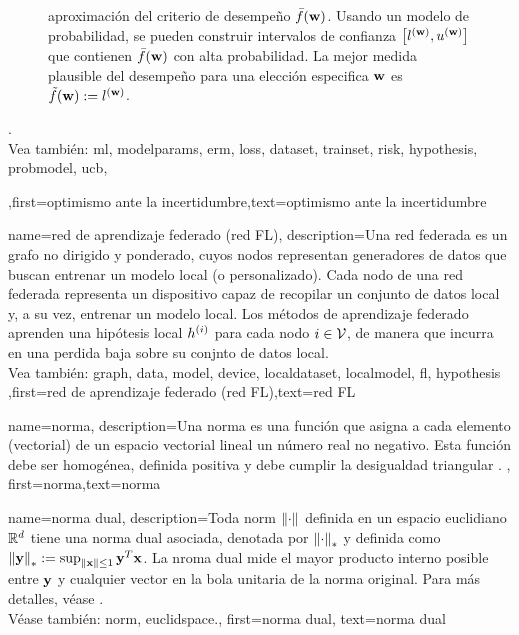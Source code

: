{{\begin{figure}[H]
\begin{center}
{	aproximación del criterio de desempeño $\bar{f}({\bf w})$. Usando un modelo de probabilidad, se pueden construir intervalos de confianza $\big[ l^{({\bf w})},  u^{({\bf w})} \big]$ 
	que contienen $\bar{f}({\bf w})$ con alta probabilidad. La mejor medida plausible del desempeño para una elección especifica ${\bf w}$ es $\tilde{f}({\bf w}) := l^{({\bf w})}$.} 
	\end{center}
		\end{figure}.
		\\
	 Vea también: \gls{ml}, \gls{modelparams}, \gls{erm}, \gls{loss}, \gls{dataset}, \gls{trainset}, \gls{risk}, \gls{hypothesis}, \gls{probmodel}, \gls{ucb},  },first={optimismo ante la incertidumbre},text={optimismo ante la incertidumbre} 
}

{name={red de aprendizaje federado (red FL)},
	description={Una red federada es un grafo no dirigido y ponderado, 
	cuyos nodos representan generadores de datos que buscan entrenar un modelo local (o personalizado). 
	Cada nodo de una red federada representa un dispositivo capaz de recopilar un conjunto de datos local
	y, a su vez, entrenar un modelo local. 
	Los métodos de aprendizaje federado aprenden una hipótesis local $h^{(i)}$ para
	cada nodo $i \in \mathcal{V}$, de manera que incurra en una perdida baja sobre su conjnto de datos local.
	\\
	 Vea también: \gls{graph},  \gls{data}, \gls{model}, \gls{device}, \gls{localdataset}, \gls{localmodel}, \gls{fl}, \gls{hypothesis}  },first={red de aprendizaje federado (red FL)},text={red FL} 
 }

{name={norma},
	description={Una norma es una función que asigna a cada elemento (vectorial) de un espacio 
		vectorial lineal un número real no negativo. Esta función debe ser homogénea, definida positiva y debe 
		cumplir la desigualdad triangular \cite{HornMatAnalysis}. },
	first={norma},text={norma} 
}

{name={norma dual},
description={Toda \gls{norm} $\left\Vert {\cdot} \right\Vert_{}$ definida en un espacio euclidiano $\mathbb{R}^{d}$ 
		tiene una norma dual asociada, denotada por $\left\Vert {\cdot} \right\Vert_{*}$ y definida como 
		$\left\Vert {{\bf y}} \right\Vert_{*} := \sup_{\Vert {{\bf x}} \Vert{} \le 1} {\bf y}^{T} {\bf x}$. 
		La nroma dual mide el mayor producto interno posible entre ${\bf y}$ y cualquier vector 
		en la bola unitaria de la norma original. Para más detalles, véase 
		\cite[Sec.~A.1.6]{BoydConvexBook}.\\ 
		Véase también: \gls{norm}, \gls{euclidspace}.},
	first={norma dual},
	text={norma dual}
}

